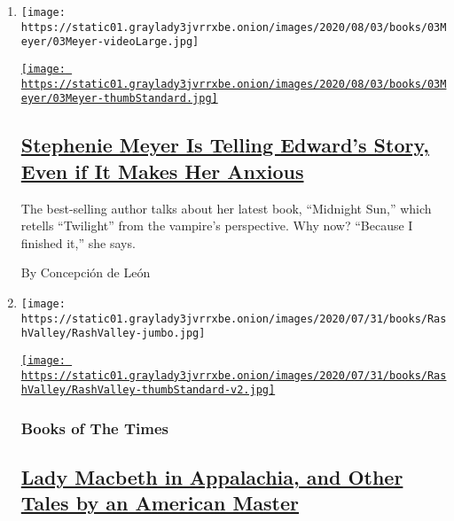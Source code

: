 \begin{enumerate}
\def\labelenumi{\arabic{enumi}.}
\item
  \texttt{[image: https://static01.graylady3jvrrxbe.onion/images/2020/08/03/books/03Meyer/03Meyer-videoLarge.jpg]}

  \href{/2020/08/03/books/midnight-sun-stephenie-meyer-twilight.html}{\texttt{[image: https://static01.graylady3jvrrxbe.onion/images/2020/08/03/books/03Meyer/03Meyer-thumbStandard.jpg]}}

  \hypertarget{stephenie-meyer-is-telling-edwards-story-even-if-it-makes-her-anxious}{%
  \subsection{\texorpdfstring{\href{/2020/08/03/books/midnight-sun-stephenie-meyer-twilight.html}{Stephenie
  Meyer Is Telling Edward's Story, Even if It Makes Her
  Anxious}}{Stephenie Meyer Is Telling Edward's Story, Even if It Makes Her Anxious}}\label{stephenie-meyer-is-telling-edwards-story-even-if-it-makes-her-anxious}}

  The best-selling author talks about her latest book, ``Midnight Sun,''
  which retells ``Twilight'' from the vampire's perspective. Why now?
  ``Because I finished it,'' she says.

  By Concepción de León
\item
  \texttt{[image: https://static01.graylady3jvrrxbe.onion/images/2020/07/31/books/RashValley/RashValley-jumbo.jpg]}

  \href{/2020/08/02/books/ron-rash-in-valley-serena.html}{\texttt{[image: https://static01.graylady3jvrrxbe.onion/images/2020/07/31/books/RashValley/RashValley-thumbStandard-v2.jpg]}}

  \hypertarget{books-of-the-times}{%
  \subsubsection{Books of The Times}\label{books-of-the-times}}

  \hypertarget{lady-macbeth-in-appalachia-and-other-tales-by-an-american-master}{%
  \subsection{\texorpdfstring{\href{/2020/08/02/books/ron-rash-in-valley-serena.html}{Lady
  Macbeth in Appalachia, and Other Tales by an American
  Master}}{Lady Macbeth in Appalachia, and Other Tales by an American Master}}\label{lady-macbeth-in-appalachia-and-other-tales-by-an-american-master}}


\end{enumerate}
